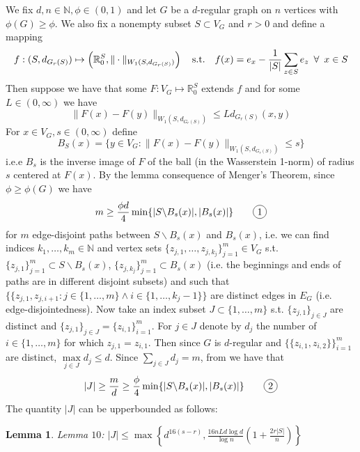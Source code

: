 \documentclass[10pt]{article}
\newtheorem{lemma}[theorem]{Lemma}
\theoremstyle{definition}
\theoremstyle{definition}
\theoremstyle{definition}
\theoremstyle{definition}
\newcommand*\circled[1]{\tikz[baseline=(char.base)]{
		\node[shape=circle,draw,inner sep=2pt] (char) {#1};}}
\begin{document}
We fix $d,n\in\mathbb{N},\phi\in(0,1)$ and let $G$ be a $d$-regular graph on $n$ vertices with $\phi(G)\ge\phi$. We also fix a nonempty subset $S\subset V_G$ and $r>0$ and define a mapping
$$f:(S,d_{G_r(S)})\mapsto\left(\mathbb{R}_0^S,\|\cdot\|_{W_1(S,d_{G_r(S)})}\right)\quad\textrm{s.t.}\quad f(x)=e_x-\frac{1}{|S|}\sum\limits_{z\in S}e_z\enskip\forall\enskip x\in S$$
Then suppose we have that some $F:V_G\mapsto\mathbb{R}_0^S$ extends $f$ and for some $L\in(0,\infty)$ we have
$$\|F(x)-F(y)\|_{W_1(S,d_{G_r(S)})}\le Ld_{G_r(S)}(x,y)$$
For $x\in V_G,s\in(0,\infty)$ define 
$$B_S(x)=\{y\in V_G:\|F(x)-F(y)\|_{W_1(S,d_{G_r(S)})}\le s\}$$
i.e.e $B_s$ is the inverse image of $F$ of the ball (in the Wasserstein 1-norm) of radius $s$ centered at $F(x)$. By the lemma consequence of Menger's Theorem, since $\phi\ge\phi(G)$ we have
$$m\ge\frac{\phi d}{4}\min\{|S\backslash B_s(x)|,|B_s(x)|\}\qquad\circled{1}$$
for $m$ edge-disjoint paths between $S\backslash B_s(x)$ and $B_s(x)$, i.e. we can find indices $k_1,\dots,k_m\in\mathbb{N}$ and vertex sets $\{z_{j,1},\dots,z_{j,k_j}\}_{j=1}^m\in V_G$ s.t. $\{z_{j,1}\}_{j=1}^m\subset S\backslash B_s(x)$, $\{z_{j,k_j}\}_{j=1}^m\subset B_s(x)$ (i.e. the beginnings and ends of paths are in different disjoint subsets) and such that $\{\{z_{j,1},z_{j,i+1}:j\in\{1,\dots,m\}\wedge i\in\{1,\dots,k_j-1\}\}$ are distinct edges in $E_G$ (i.e. edge-disjointedness). Now take an index subset $J\subset\{1,\dots,m\}$ s.t. $\{z_{j,1}\}_{j\in J}$ are distinct and $\{z_{j,1}\}_{j\in J}=\{z_{i,1}\}_{i=1}^m$. For $j\in J$ denote by $d_j$ the number of $i\in\{1,\dots,m\}$ for which $z_{j,1}=z_{i,1}$. Then since $G$ is $d$-regular and $\{\{z_{i,1},z_{i,2}\}\}_{i=1}^m$ are distinct, $\max\limits_{j\in J}d_j\le d$. Since $\sum\limits_{j\in J}d_j=m$, from \circled{1} we have that
$$|J|\ge\frac{m}{d}\ge\frac{\phi}{4}\min\{|S\backslash B_s(x)|,|B_s(x)|\}\qquad\circled{2}$$
\noindent The quantity $|J|$ can be upperbounded as follows:\\
\begin{lemma} Lemma $10$:
$|J|\le\max\left\{d^{16(s-r)},\frac{16nLd\log d}{\log n}\left(1+\frac{2r|S|}{n}\right)\right\}$
\end{lemma}
\end{document}

